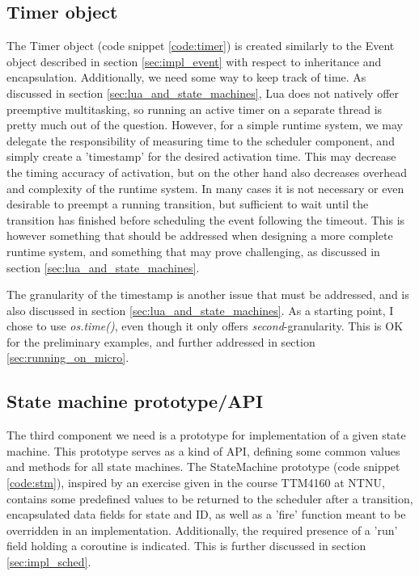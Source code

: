 \subsection{Timer object}
\label{sec:impl_timer}
The Timer object (code snippet \ref{code:timer}) is created similarly to the Event object described in section \ref{sec:impl_event} with respect to inheritance and encapsulation. Additionally, we need some way to keep track of time. As discussed in section \ref{sec:lua_and_state_machines}, Lua does not natively offer preemptive multitasking, so running an active timer on a separate thread is pretty much out of the question. However, for a simple runtime system, we may delegate the responsibility of measuring time to the scheduler component, and simply create a 'timestamp' for the desired activation time. This may decrease the timing accuracy of activation, but on the other hand also decreases overhead and complexity of the runtime system. In many cases it is not necessary or even desirable to preempt a running transition, but sufficient to wait until the transition has finished before scheduling the event following the timeout. This is however something that should be addressed when designing a more complete runtime system, and something that may prove challenging, as discussed in section \ref{sec:lua_and_state_machines}.

The granularity of the timestamp is another issue that must be addressed, and is also discussed in section \ref{sec:lua_and_state_machines}. As a starting point, I chose to use \textit{os.time()}, even though it only offers \textit{second}-granularity. This is OK for the preliminary examples, and further addressed in section \ref{sec:running_on_micro}.

\subsection{State machine prototype/API}
The third component we need is a prototype for implementation of a given state machine. This prototype serves as a kind of API, defining some common values and methods for all state machines. The StateMachine prototype (code snippet \ref{code:stm}), inspired by an exercise given in the course TTM4160 at NTNU, contains some predefined values to be returned to the scheduler after a transition, encapsulated data fields for state and ID, as well as a 'fire' function meant to be overridden in an implementation. Additionally, the required presence of a 'run' field holding a coroutine is indicated. This is further discussed in section \ref{sec:impl_sched}.

